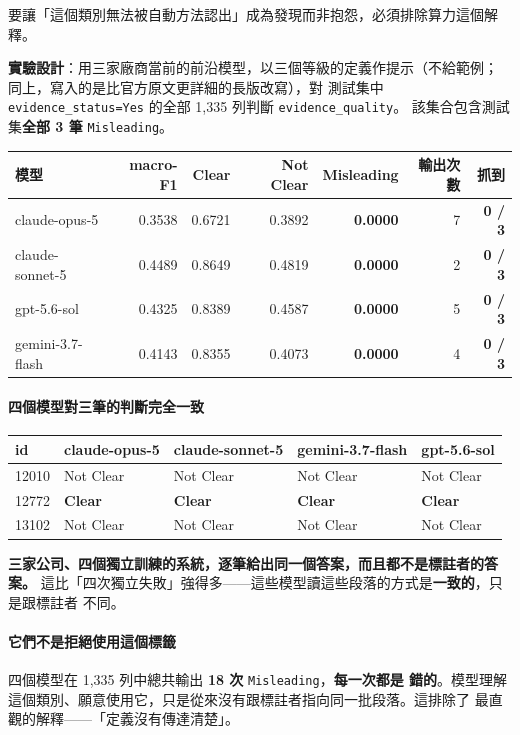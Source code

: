 \documentclass[11pt,a4paper]{ctexart}
\newcommand{\fn}[1]{\texttt{#1}}
\begin{document}
要讓「這個類別無法被自動方法認出」成為發現而非抱怨，必須排除算力這個解釋。

\textbf{實驗設計}：用三家廠商當前的前沿模型，以三個等級的定義作提示（不給範例；
同上，寫入的是比官方原文更詳細的長版改寫），對
測試集中 \fn{evidence\_status=Yes} 的全部 1{,}335 列判斷 \fn{evidence\_quality}。
該集合包含測試集\textbf{全部 3 筆} \fn{Misleading}。

\begin{table}[h]
\centering\small
\begin{tabular}{@{}lrrrrrr@{}}
\toprule
模型 & macro-F1 & Clear & Not Clear & Misleading & 輸出次數 & 抓到 \\
\midrule
claude-opus-5    & 0.3538 & 0.6721 & 0.3892 & \textbf{0.0000} & 7 & \textbf{0 / 3} \\
claude-sonnet-5  & 0.4489 & 0.8649 & 0.4819 & \textbf{0.0000} & 2 & \textbf{0 / 3} \\
gpt-5.6-sol      & 0.4325 & 0.8389 & 0.4587 & \textbf{0.0000} & 5 & \textbf{0 / 3} \\
gemini-3.7-flash & 0.4143 & 0.8355 & 0.4073 & \textbf{0.0000} & 4 & \textbf{0 / 3} \\
\bottomrule
\end{tabular}
\end{table}

\paragraph{四個模型對三筆的判斷完全一致}

\begin{table}[h]
\centering\small
\begin{tabular}{@{}lllll@{}}
\toprule
id & claude-opus-5 & claude-sonnet-5 & gemini-3.7-flash & gpt-5.6-sol \\
\midrule
12010 & Not Clear & Not Clear & Not Clear & Not Clear \\
\rowcolor{red!10}
12772 & \textbf{Clear} & \textbf{Clear} & \textbf{Clear} & \textbf{Clear} \\
13102 & Not Clear & Not Clear & Not Clear & Not Clear \\
\bottomrule
\end{tabular}
\end{table}

\textbf{三家公司、四個獨立訓練的系統，逐筆給出同一個答案，而且都不是標註者的答案。}
這比「四次獨立失敗」強得多——這些模型讀這些段落的方式是\textbf{一致的}，只是跟標註者
不同。

\paragraph{它們不是拒絕使用這個標籤}
四個模型在 1{,}335 列中總共輸出 \textbf{18 次} \fn{Misleading}，\textbf{每一次都是
錯的}。模型理解這個類別、願意使用它，只是從來沒有跟標註者指向同一批段落。這排除了
最直觀的解釋——「定義沒有傳達清楚」。
\end{document}
